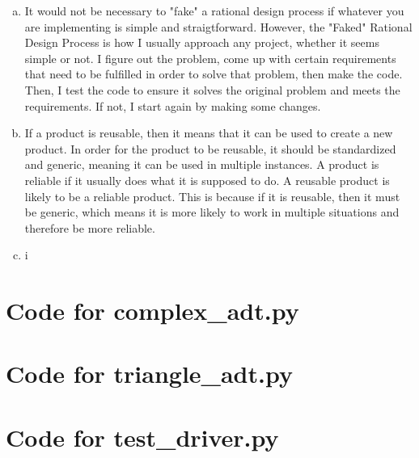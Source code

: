 \documentclass[12pt]{article}
\begin{document}
\begin{enumerate}[(a)]
\item It would not be necessary to "fake" a rational design process if whatever you are implementing is simple and straigtforward. However, the "Faked" Rational Design Process is how I usually approach any project, whether it seems simple or not. I figure out the problem, come up with certain requirements that need to be fulfilled in order to solve that problem, then make the code. Then, I test the code to ensure it solves the original problem and meets the requirements. If not, I start again by making some changes.
\item If a product is reusable, then it means that it can be used to create a new product. In order for the product to be reusable, it should be standardized and generic, meaning it can be used in multiple instances. A product is reliable if it usually does what it is supposed to do. A reusable product is likely to be a reliable product. This is because if it is reusable, then it must be generic, which means it is more likely to work in multiple situations and therefore be more reliable.
\item i

\end{enumerate}

\newpage

\lstset{language=Python, basicstyle=\tiny, breaklines=true, showspaces=false,
  showstringspaces=false, breakatwhitespace=true}

\def\thesection{\Alph{section}}

\section{Code for complex\_adt.py}

\noindent 

\newpage

\section{Code for triangle\_adt.py}

\noindent 

\newpage

\section{Code for test\_driver.py}
\end{document}
